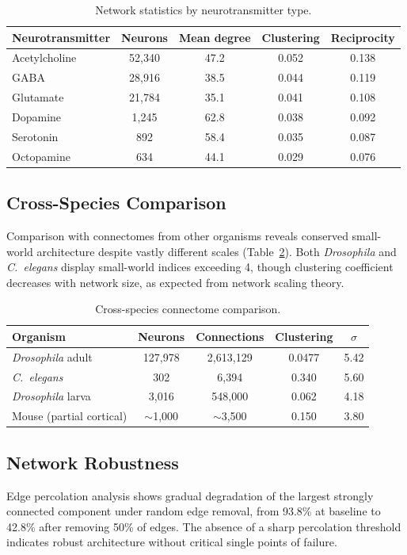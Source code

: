 \documentclass[11pt]{article}
\begin{document}
\begin{table}[h]
\centering
\caption{Network statistics by neurotransmitter type.}
\label{tab:nt}
\begin{tabular}{lcccc}
\toprule
Neurotransmitter & Neurons & Mean degree & Clustering & Reciprocity \\
\midrule
Acetylcholine & 52,340 & 47.2 & 0.052 & 0.138 \\
GABA & 28,916 & 38.5 & 0.044 & 0.119 \\
Glutamate & 21,784 & 35.1 & 0.041 & 0.108 \\
Dopamine & 1,245 & 62.8 & 0.038 & 0.092 \\
Serotonin & 892 & 58.4 & 0.035 & 0.087 \\
Octopamine & 634 & 44.1 & 0.029 & 0.076 \\
\bottomrule
\end{tabular}
\end{table}

\subsection{Cross-Species Comparison}
Comparison with connectomes from other organisms reveals conserved small-world architecture despite vastly different scales (Table~\ref{tab:species}). Both \textit{Drosophila} and \textit{C.\ elegans} display small-world indices exceeding 4, though clustering coefficient decreases with network size, as expected from network scaling theory.

\begin{table}[h]
\centering
\caption{Cross-species connectome comparison.}
\label{tab:species}
\begin{tabular}{lcccc}
\toprule
Organism & Neurons & Connections & Clustering & $\sigma$ \\
\midrule
\textit{Drosophila} adult & 127,978 & 2,613,129 & 0.0477 & 5.42 \\
\textit{C.\ elegans} & 302 & 6,394 & 0.340 & 5.60 \\
\textit{Drosophila} larva & 3,016 & 548,000 & 0.062 & 4.18 \\
Mouse (partial cortical) & $\sim$1,000 & $\sim$3,500 & 0.150 & 3.80 \\
\bottomrule
\end{tabular}
\end{table}

\subsection{Network Robustness}
Edge percolation analysis shows gradual degradation of the largest strongly connected component under random edge removal, from 93.8\% at baseline to 42.8\% after removing 50\% of edges. The absence of a sharp percolation threshold indicates robust architecture without critical single points of failure.
\end{document}
